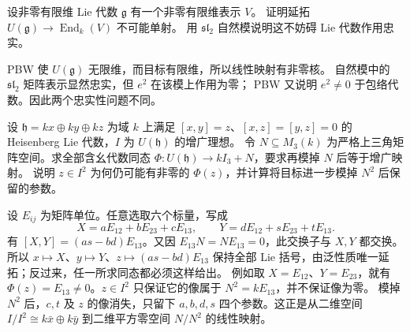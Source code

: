 \begin{exercise}\label{b5:ex:15-faithful-lie-not-enveloping}
	设非零有限维 Lie 代数 \(\mathfrak g\) 有一个非零有限维表示 \(V\)。 证明延拓 \(U(\mathfrak g)\to\operatorname{End}_k(V)\) 不可能单射。 用 \(\mathfrak{sl}_2\) 自然模说明这不妨碍 Lie 代数作用忠实。
\end{exercise}
\begin{solution}
	PBW 使 \(U(\mathfrak g)\) 无限维，而目标有限维，所以线性映射有非零核。 自然模中的 \(\mathfrak{sl}_2\) 矩阵表示显然忠实，但 \(e^2\) 在该模上作用为零； PBW 又说明 \(e^2\ne0\) 于包络代数。因此两个忠实性问题不同。
\end{solution}

\begin{exercise}\label{b5:ex:15-augmentation-cotangent}
	设 \(\mathfrak h=kx\oplus ky\oplus kz\) 为域 \(k\) 上满足 \([x,y]=z\)、\([x,z]=[y,z]=0\) 的 Heisenberg Lie 代数，\(I\) 为 \(U(\mathfrak h)\) 的增广理想。 令 \(N\subseteq M_3(k)\) 为严格上三角矩阵空间。求全部含幺代数同态 \(\Phi:U(\mathfrak h)\to kI_3+N\)，要求再模掉 \(N\) 后等于增广映射。 说明 \(z\in I^2\) 为何仍可能有非零的 \(\Phi(z)\)，并计算将目标进一步模掉 \(N^2\) 后保留的参数。
\end{exercise}
\begin{solution}
	设 \(E_{ij}\) 为矩阵单位。任意选取六个标量，写成
	\[
		X=aE_{12}+bE_{23}+cE_{13},\qquad Y=dE_{12}+sE_{23}+tE_{13}.
	\]
	有 \([X,Y]=(as-bd)E_{13}\)。又因 \(E_{13}N=NE_{13}=0\)，此交换子与 \(X,Y\) 都交换。 所以 \(x\mapsto X\)、\(y\mapsto Y\)、\(z\mapsto(as-bd)E_{13}\) 保持全部 Lie 括号，由泛性质唯一延拓；反过来，任一所求同态都必须这样给出。 例如取 \(X=E_{12}\)、\(Y=E_{23}\)，就有 \(\Phi(z)=E_{13}\ne0\)。\(z\in I^2\) 只保证它的像属于 \(N^2=kE_{13}\)，并不保证像为零。 模掉 \(N^2\) 后，\(c,t\) 及 \(z\) 的像消失，只留下 \(a,b,d,s\) 四个参数。这正是从二维空间 \(I/I^2\cong k\bar x\oplus k\bar y\) 到二维平方零空间 \(N/N^2\) 的线性映射。
\end{solution}

